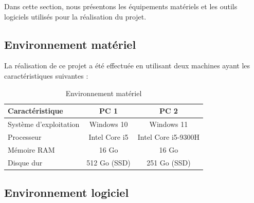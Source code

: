 Dans cette section, nous présentons les équipements matériels et les outils logiciels utilisés pour la réalisation du projet.

\subsection{Environnement matériel}

La réalisation de ce projet a été effectuée en utilisant deux machines ayant les caractéristiques suivantes :

\begin{table}[H]
\centering
\caption{Environnement matériel}
\begin{tabular}{|l|c|c|}
\hline
\textbf{Caractéristique} & \textbf{PC 1} & \textbf{PC 2} \\
\hline
Système d’exploitation & Windows 10 & Windows 11 \\
\hline
Processeur & Intel Core i5 & Intel Core i5-9300H \\
\hline
Mémoire RAM & 16 Go & 16 Go \\
\hline
Disque dur & 512 Go (SSD) & 251 Go (SSD) \\
\hline
\end{tabular}
\end{table}

\FloatBarrier
\newpage
\subsection{Environnement logiciel}

\renewcommand{\arraystretch}{2.3}

